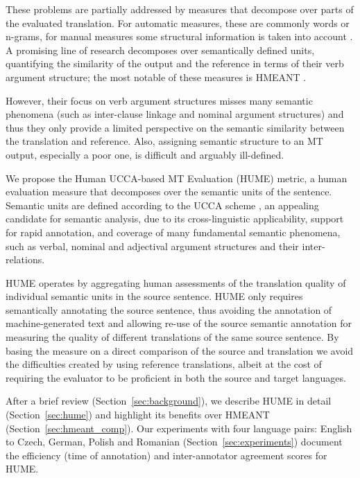 \documentclass[11pt]{article}
\newcommand{\secref}[1]{Section~\ref{#1}}
\newcommand{\XXX}[1]{}
\def\parcite#1{\cite{#1}}
\begin{document}
These problems are partially addressed by measures that decompose over parts of the evaluated
translation. For automatic measures,
these are commonly words or n-grams, for manual measures some structural
information is taken into account \parcite{machacek:bojar:segranks:2015}.
A promising line of research decomposes
over semantically defined units,
quantifying the similarity of the output and the reference in terms of
their verb argument structure; the most notable of these measures is
HMEANT \cite{lo2011structured}.
\XXX{Do we want to cut the following shorter?}
However, 
their focus on verb argument structures misses many semantic phenomena
(such as inter-clause linkage and nominal argument structures) and thus they only provide
a limited perspective on the semantic similarity between the translation and reference.
Also, assigning semantic structure to an MT output, especially a poor one,
is difficult and arguably ill-defined.

We propose the Human UCCA-based MT Evaluation (HUME) metric,
a human evaluation measure that decomposes over the semantic units of the sentence.
Semantic units are defined according to the 
UCCA scheme \cite{abend2013universal}, an appealing candidate for semantic analysis,
due to its cross-linguistic applicability, support for rapid annotation, and coverage
of many fundamental semantic phenomena, such as verbal, nominal and adjectival
argument structures and their inter-relations.

HUME operates by aggregating human assessments of the translation quality of individual
semantic units in the source sentence.
HUME only requires semantically annotating the source sentence,
thus avoiding the annotation of machine-generated text 
and allowing re-use of the source semantic annotation for measuring the quality
of different translations of the same source sentence.
By basing the measure on a direct comparison
of the source and translation we avoid the difficulties created by using
reference translations, albeit at the cost of requiring the
evaluator to be proficient in both the source and target languages.

After a brief review (\secref{sec:background}), we describe HUME in detail
(\secref{sec:hume}) and highlight its benefits over HMEANT
(\secref{sec:hmeant_comp}).
Our experiments with four language pairs: English to Czech, German, Polish and Romanian (\secref{sec:experiments}) document the
efficiency (time of annotation) and inter-annotator agreement scores for HUME.
\end{document}
